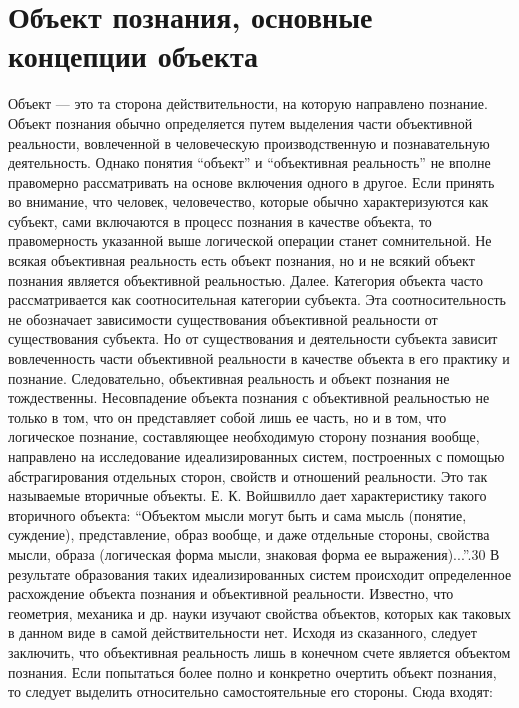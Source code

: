 \documentclass[12pt]{article}
\begin{document}
\newpage
\section{Объект познания, основные концепции объекта}
Объект — это та сторона действительности, на которую направлено познание.
Объект  познания  обычно  определяется  путем  выделения  части  объективной  реальности,  вовлеченной  в
человеческую производственную и познавательную деятельность. Однако понятия “объект” и “объективная
реальность” не вполне правомерно рассматривать на основе включения одного в другое. Если принять во
внимание,  что  человек,  человечество,  которые  обычно  характеризуются  как  субъект,  сами  включаются  в
процесс  познания  в  качестве  объекта,  то  правомерность  указанной  выше  логической  операции  станет
сомнительной.  Не  всякая  объективная  реальность  есть  объект  познания,  но  и  не  всякий  объект  познания
является объективной реальностью.
Далее.  Категория  объекта  часто  рассматривается  как  соотносительная  категории  субъекта.  Эта
соотносительность  не  обозначает  зависимости  существования  объективной  реальности  от  существования
субъекта. Но от существования и деятельности субъекта зависит вовлеченность части объективной реальности в
качестве объекта в его практику и познание. Следовательно, объективная реальность и объект познания не
тождественны.
Несовпадение объекта познания с объективной реальностью не только в том, что он представляет собой лишь
ее  часть,  но  и  в  том,  что  логическое  познание,  составляющее  необходимую  сторону  познания  вообще,
направлено на исследование идеализированных систем, построенных с помощью абстрагирования отдельных
сторон, свойств и отношений реальности. Это так называемые вторичные объекты. Е. К. Войшвилло дает
характеристику такого вторичного объекта: “Объектом мысли могут быть и сама мысль (понятие, суждение),
представление, образ вообще, и даже отдельные стороны, свойства мысли, образа (логическая форма мысли,
знаковая форма ее выражения)...”.30 В результате образования таких идеализированных систем происходит
определенное расхождение объекта познания и объективной реальности. Известно, что геометрия, механика и
др. науки изучают свойства объектов, которых как таковых в данном виде в самой действительности нет.
Исходя  из  сказанного,  следует  заключить,  что  объективная  реальность  лишь  в  конечном  счете  является
объектом познания. Если попытаться более полно и конкретно очертить объект познания, то следует выделить
относительно самостоятельные его стороны. Сюда входят:
\end{document}
